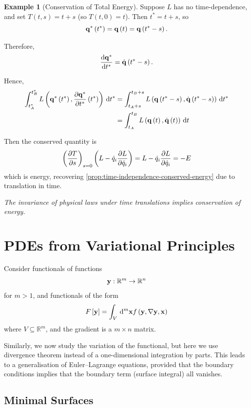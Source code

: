 \documentclass[11pt]{article}
\numberwithin{equation}{section}
\theoremstyle{definition}
\newtheorem{example}[theorem]{Example}
\theoremstyle{remark}
\newcommand{\pqty}[1]{\left(#1\right)}
\newcommand{\bqty}[1]{\left[#1\right]}
\newcommand{\functiondomain}[3]{#1:#2\to #3}
\newcommand{\RR}{\mathbb{R}}
\newcommand{\grad}{\nabla}
\begin{document}
\begin{example}[Conservation of Total Energy]\label{variation-unit-0084}
    Suppose \(L\) has no time-dependence, and set \(T\pqty{t, s} = t + s\) (so \(T\pqty{t, 0} = t\)). Then \(t^{\ast} = t + s\), so
    \[
        \vb{q}^{\ast} \pqty{t^{\ast}} = \vb{q} \pqty{t} = \vb{q} \pqty{t^{\ast} - s}.
    \]  

    Therefore,
    \[
        \dv{\vb{q}^{\ast}}{t^{\ast}} = \dot{\vb{q}} \pqty{t^{\ast} - s}.
    \]

    Hence,
    \begin{align*}
        \int_{t_A^{\ast}}^{t_B^{\ast}} L\pqty{\vb{q}^{\ast} \pqty{t^{\ast}}, \pdv{\vb{q}^{\ast}}{t^{\ast}} \pqty{t^{\ast}}} \dd{t^{\ast}} &= \int_{t_A + s}^{t_B + s} L\pqty{\vb{q} \pqty{t^{\ast} - s}, \dot{\vb{q}} \pqty{t^{\ast} - s}} \dd{t^{\ast}} \\
        &= \int_{t_A}^{t_B} L\pqty{\vb{q} \pqty{t}, \dot{\vb{q}} \pqty{t}} \dd{t}
    \end{align*}

    Then the conserved quantity is
    \[
        \pqty{\pdv{T}{s}}_{s = 0} \pqty{L - \dot{q}_i \pdv{L}{\dot{q}_i}} = L - \dot{q}_i \pdv{L}{\dot{q}_i} = -E
    \]
    which is energy, recovering \autoref{prop:time-independence-conserved-energy} due to translation in time.

    \textit{The invariance of physical laws under time translations implies conservation of energy.}
\end{example}

\section{PDEs from Variational Principles}

Consider functionals of functions
\[
    \functiondomain{\vb{y}}{\RR^{m}}{\RR^{n}}
\]
for \(m > 1\), and functionals of the form
\[
    F\bqty{\vb{y}} = \int_{V} \dd[m]{\vb{x}} f\pqty{\vb{y}, \grad \vb{y}, \vb{x}}
\]
where \(V \subseteq \RR^m\), and the gradient is a \(m \times n\) matrix.

Similarly, we now study the variation of the functional, but here we use divergence theorem instead of a one-dimensional integration by parts. This leads to a generalisation of Euler--Lagrange equations, provided that the boundary conditions implies that the boundary term (surface integral) all vanishes.

\subsection{Minimal Surfaces}
\end{document}
